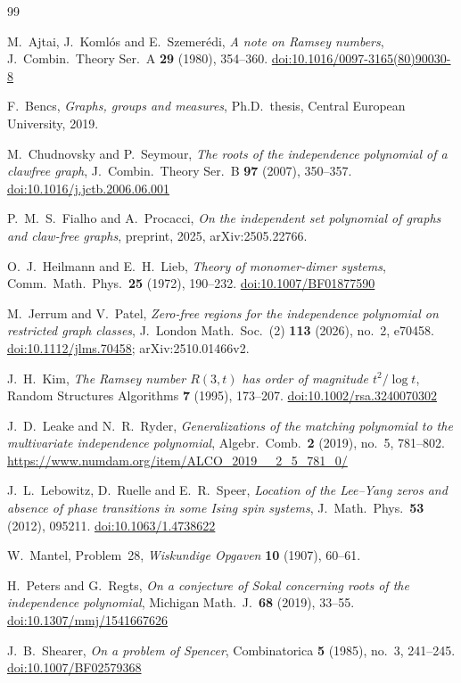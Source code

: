 \documentclass[11pt]{article}
\theoremstyle{remark}
\providecommand{\doi}[1]{\href{https://doi.org/#1}{doi:#1}}
\begin{document}
\begin{thebibliography}{99}

M.~Ajtai, J.~Koml\'os and E.~Szemer\'edi,
\emph{A note on Ramsey numbers},
J.\ Combin.\ Theory Ser.\ A \textbf{29} (1980), 354--360.
\doi{10.1016/0097-3165(80)90030-8}

F.~Bencs,
\emph{Graphs, groups and measures},
Ph.D.\ thesis, Central European University, 2019.

M.~Chudnovsky and P.~Seymour,
\emph{The roots of the independence polynomial of a clawfree graph},
J.\ Combin.\ Theory Ser.\ B \textbf{97} (2007), 350--357.
\doi{10.1016/j.jctb.2006.06.001}

P.~M.~S.~Fialho and A.~Procacci,
\emph{On the independent set polynomial of graphs and claw-free graphs},
preprint, 2025, arXiv:2505.22766.

O.~J.~Heilmann and E.~H.~Lieb,
\emph{Theory of monomer-dimer systems},
Comm.\ Math.\ Phys.\ \textbf{25} (1972), 190--232.
\doi{10.1007/BF01877590}

M.~Jerrum and V.~Patel,
\emph{Zero-free regions for the independence polynomial on restricted graph classes},
J.\ London Math.\ Soc.\ (2) \textbf{113} (2026), no.~2, e70458.
\doi{10.1112/jlms.70458}; arXiv:2510.01466v2.

J.~H.~Kim,
\emph{The Ramsey number $R(3,t)$ has order of magnitude $t^2/\log t$},
Random Structures Algorithms \textbf{7} (1995), 173--207.
\doi{10.1002/rsa.3240070302}

J.~D.~Leake and N.~R.~Ryder,
\emph{Generalizations of the matching polynomial to the multivariate independence polynomial},
Algebr.\ Comb.\ \textbf{2} (2019), no.~5, 781--802.
\url{https://www.numdam.org/item/ALCO_2019__2_5_781_0/}

J.~L.~Lebowitz, D.~Ruelle and E.~R.~Speer,
\emph{Location of the Lee--Yang zeros and absence of phase transitions in some Ising spin systems},
J.\ Math.\ Phys.\ \textbf{53} (2012), 095211.
\doi{10.1063/1.4738622}

W.~Mantel,
Problem~28,
\emph{Wiskundige Opgaven} \textbf{10} (1907), 60--61.

H.~Peters and G.~Regts,
\emph{On a conjecture of Sokal concerning roots of the independence polynomial},
Michigan Math.\ J.\ \textbf{68} (2019), 33--55.
\doi{10.1307/mmj/1541667626}

J.~B.~Shearer,
\emph{On a problem of Spencer},
Combinatorica \textbf{5} (1985), no.~3, 241--245.
\doi{10.1007/BF02579368}


\end{thebibliography}
\end{document}
